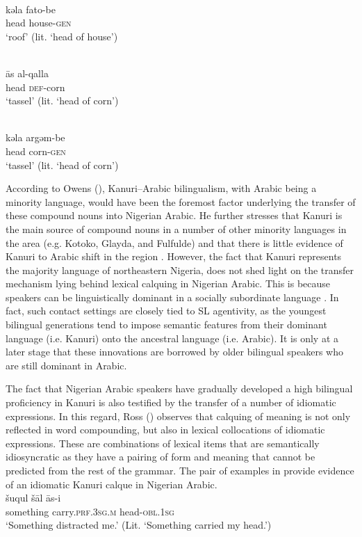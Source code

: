 \documentclass[output=paper]{langsci/langscibook}
\begin{document}
\\
\gll   kǝla fato-be   \\
       head house-\textsc{gen}\\
\glt   `roof' (lit. ‘head of house’)
\z
\z

\ea\label{ex:tassel}
\\
\gll   {\R}ās al-qalla  \\
       head \textsc{def}-corn\\
\glt   `tassel' (lit. ‘head of corn')

\\
\gll   kǝla argǝm-be \\
       head corn-\textsc{gen} \\
\glt   `tassel' (lit. ‘head of corn')
\z
\z

According to Owens (\citeyear[65]{Owens2016idioms}), Kanuri–Arabic bilingualism, with Arabic being a minority language, would have been the foremost factor underlying the transfer of these compound nouns into Nigerian Arabic. He further stresses that Kanuri is the main source of compound nouns in a number of other minority languages in the area (e.g. Kotoko, Glayda, and Fulfulde) and that there is little evidence of Kanuri to Arabic shift in the region \citep[147]{Owens2014}. However, the fact that Kanuri represents the majority language of northeastern Nigeria, does not shed light on the transfer mechanism lying behind lexical calquing in Nigerian Arabic. This is because speakers can be linguistically dominant in a socially subordinate language \citep[376]{Winford2005}. In fact, such contact settings are closely tied to SL agentivity, as the youngest bilingual generations tend to impose semantic features from their dominant language (i.e. Kanuri) onto the ancestral language (i.e. Arabic). It is only at a later stage that these innovations are borrowed by older bilingual speakers who are still dominant in Arabic. 

The fact that Nigerian Arabic speakers have gradually developed a high bilingual proficiency in Kanuri is also testified by the transfer of a number of idiomatic expressions. In this regard, Ross (\citeyear[122]{Ross2007}) observes that calquing of meaning is not only reflected in word compounding, but also in lexical collocations of idiomatic expressions. These are combinations of lexical items that are semantically idiosyncratic as they have a pairing of form and meaning that cannot be predicted from the rest of the grammar. The pair of examples in  provide evidence of an idiomatic Kanuri calque in Nigerian Arabic. 
\newpage
\ea\label{distract}
\\
\gll   šuqul šāl {\R}ās-i\\
       something carry.\textsc{prf.3sg.m} head-\textsc{obl.1sg}\\
\glt   `Something distracted me.' (Lit. ‘Something carried my head.’)
\end{document}
